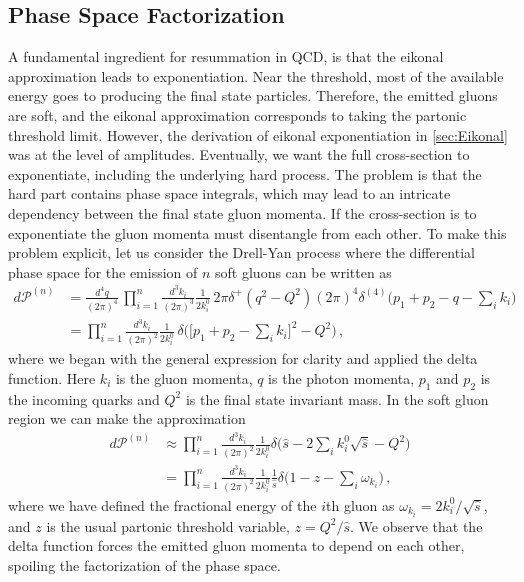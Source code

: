 \subsection{Phase Space Factorization}
A fundamental ingredient for resummation in QCD, is that the eikonal approximation leads to exponentiation. Near the threshold, most of the available energy goes to producing the final state particles. Therefore, the emitted gluons are soft, and the eikonal approximation corresponds to taking the partonic threshold limit. However, the derivation of eikonal exponentiation in \cref{sec:Eikonal} was at the level of amplitudes. Eventually, we want the full cross-section to exponentiate, including the underlying hard process. The problem is that the hard part contains phase space integrals, which may lead to an intricate dependency between the final state gluon momenta. If the cross-section is to exponentiate the gluon momenta must disentangle from each other. To make this problem explicit, let us consider the Drell-Yan process where the differential phase space for the emission of $n$ soft gluons can be written as
\begin{align}
    d\mathcal{P}^{(n)}&=\frac{d^{4}q}{(2\pi)^{4}}\,\prod_{i=1}^{n}\frac{d^{3}k_{i}}{(2\pi)^{3}}\frac{1}{2k_{i}^{0}}\,2\pi\delta^{+}(q^{2}-Q^{2})(2\pi)^{4}\delta^{(4)}\Big(p_1+p_2-q-\sum_{i}k_i\Big)\nonumber
    \\
    &=\prod_{i=1}^{n}\frac{d^{3}k_{i}}{(2\pi)^{2}}\frac{1}{2k_{i}^{0}}\,\delta\Big(\Big[p_1+p_2-\sum_{i}k_i\Big]^{2}-Q^{2}\Big)\,,
\end{align}
where we began with the general expression for clarity and applied the delta function. Here $k_i$ is the gluon momenta, $q$ is the photon momenta, $p_1$ and $p_2$ is the incoming quarks and $Q^{2}$ is the final state invariant mass. In the soft gluon region we can make the approximation 
\begin{align}\label{eq:n-phase space exponentiation}
    d\mathcal{P}^{(n)}&\approx\prod_{i=1}^{n}\frac{d^{3}k_{i}}{(2\pi)^{2}}\frac{1}{2k_{i}^{0}}\delta\Big(\hat{s}-2\sum_{i}k_{i}^{0}\sqrt{\hat{s}}-Q^{2}\Big)\nonumber
    \\
    &=\prod_{i=1}^{n}\frac{d^{3}k_{i}}{(2\pi)^{2}}\frac{1}{2k_{i}^{0}}\frac{1}{\hat{s}}\delta\Big(1-z-\sum_i \omega_{k_i}\Big)\,,
\end{align}
where we have defined the fractional energy of the $i$th gluon as $\omega_{k_i}=2k_i^{0}/\sqrt{\hat{s}}$, and $z$ is the usual partonic threshold variable, $z=Q^{2}/\hat{s}$. We observe that the delta function forces the emitted gluon momenta to depend on each other, spoiling the factorization of the phase space.

